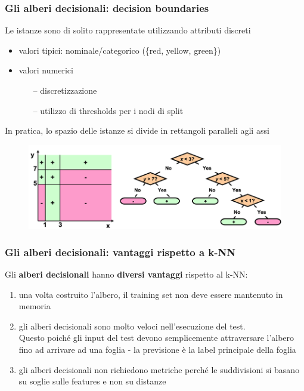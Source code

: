\begin{frame}
	
	\frametitle{Gli alberi decisionali: decision boundaries}
	
	Le istanze sono di solito rappresentate utilizzando attributi discreti
	\begin{itemize}
		\item valori tipici: nominale/categorico (\{red, yellow, green\})
		\item valori numerici
			\begin{itemize}
				\item[--] discretizzazione
				\item[--] utilizzo di thresholds per i nodi di split
			\end{itemize}
	\end{itemize}
	In pratica, lo spazio delle istanze si divide in rettangoli paralleli agli assi
	\begin{figure}[!htbp]
		\centering
		\includegraphics[width=1.00\linewidth]{images/supervised/decision_trees/example_decision_boundaries.png}
	\end{figure}
\end{frame}


\begin{frame}
	
	\frametitle{Gli alberi decisionali: vantaggi rispetto a k-NN}
	
	Gli \textbf{alberi decisionali} hanno \textbf{diversi vantaggi} rispetto al k-NN:
	\pause	
	\begin{enumerate}
		\item una volta costruito l'albero, il training set non deve essere mantenuto in memoria%
		\pause
		\item gli alberi decisionali sono molto veloci nell'esecuzione del test.\\
			Questo poiché gli input del test devono semplicemente attraversare l'albero fino ad arrivare ad una foglia - la previsione è la label principale della foglia
		\pause
		\item gli alberi decisionali non richiedono metriche perché le suddivisioni si basano su soglie sulle features e non su distanze
	\end{enumerate}
	
\end{frame}



